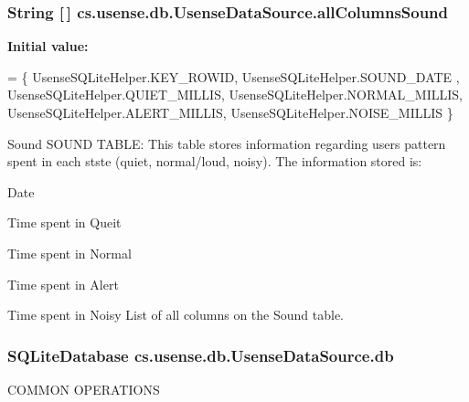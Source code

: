 \subsubsection[{all\+Columns\+Sound}]{\setlength{\rightskip}{0pt plus 5cm}String \mbox{[}$\,$\mbox{]} cs.\+usense.\+db.\+Usense\+Data\+Source.\+all\+Columns\+Sound}\label{classcs_1_1usense_1_1db_1_1_usense_data_source_a974d57d1a21d3d3d4769d6ad8be5d15e}
{\bfseries Initial value\+:}
\begin{DoxyCode}
= \{ 
            UsenseSQLiteHelper.KEY\_ROWID,
            UsenseSQLiteHelper.SOUND\_DATE ,
            UsenseSQLiteHelper.QUIET\_MILLIS,
            UsenseSQLiteHelper.NORMAL\_MILLIS,
            UsenseSQLiteHelper.ALERT\_MILLIS,
            UsenseSQLiteHelper.NOISE\_MILLIS
    \}
\end{DoxyCode}
Sound S\+O\+U\+N\+D T\+A\+B\+L\+E\+: This table stores information regarding user\textquotesingle{}s pattern spent in each stste (quiet, normal/loud, noisy). The information stored is\+:
\begin{DoxyItemize}
\item Date
\item Time spent in Queit
\item Time spent in Normal
\item Time spent in Alert
\item Time spent in Noisy List of all columns on the Sound table. 
\end{DoxyItemize}\hypertarget{classcs_1_1usense_1_1db_1_1_usense_data_source_abb7afa1a31cea70787b725a5e5e4efdd}{}
\subsubsection[{db}]{\setlength{\rightskip}{0pt plus 5cm}S\+Q\+Lite\+Database cs.\+usense.\+db.\+Usense\+Data\+Source.\+db\hspace{0.3cm}{\ttfamily [private]}}\label{classcs_1_1usense_1_1db_1_1_usense_data_source_abb7afa1a31cea70787b725a5e5e4efdd}
C\+O\+M\+M\+O\+N O\+P\+E\+R\+A\+T\+I\+O\+N\+S \hypertarget{classcs_1_1usense_1_1db_1_1_usense_data_source_aa008324e180fdd3b8a05df5592323953}{}
